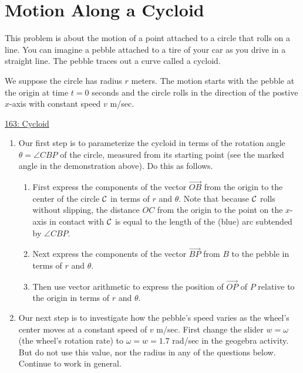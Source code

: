 \documentclass{ximera}
\begin{document}
\section{Motion Along a Cycloid}
\begin{question} \label{Q4950504333}
This problem is about the motion of a point attached to a circle that rolls on a line. You can imagine a pebble attached to a tire of your car as you drive in a straight line. The pebble traces out a curve called a cycloid.

We suppose the circle has radius $r$ meters. The motion starts with the pebble at the origin at time $t=0$ seconds and the circle rolls in the direction of the postive $x$-axis with constant speed $v$ m/sec.

\begin{onlineOnly}
    \begin{center}
\end{center}
\end{onlineOnly}

\href{https://www.geogebra.org/classic/rrzgbtfr}{163: Cycloid}

\begin{enumerate}
\item Our first step is to parameterize the cycloid in terms of the rotation angle $\theta = \angle CBP$ of the circle, measured from its starting point (see the marked angle in the demonstration above). Do this as follows.

\begin{enumerate}
\item First express the components of the vector $\overrightarrow{OB}$ from the origin to the center of the circle ${\cal C}$ in terms of $r$ and $\theta$. Note that because ${\cal C}$ rolls without slipping, the distance $OC$ from the origin to the point on the $x$-axis in contact with ${\cal C}$ is equal to the length of the (blue) arc subtended by $\angle CBP$.

\item Next express the components of the vector $\overrightarrow{BP}$ from $B$ to the pebble in terms of $r$ and $\theta$.

\item Then use vector arithmetic to express the position of $\overrightarrow{OP}$ of $P$ relative to the origin in terms of $r$ and $\theta$.
\end{enumerate}

\item Our next step is to investigate how the pebble's speed varies as the wheel's center moves at a constant speed of $v$ m/sec.
First change the slider $w = \omega$ (the wheel's rotation rate) to $\omega = w = 1.7$ rad/sec in the geogebra activity. But do not use this value, nor the radius in any of the questions below. Continue to work in general.


\end{enumerate}
\end{question}
\end{document}
